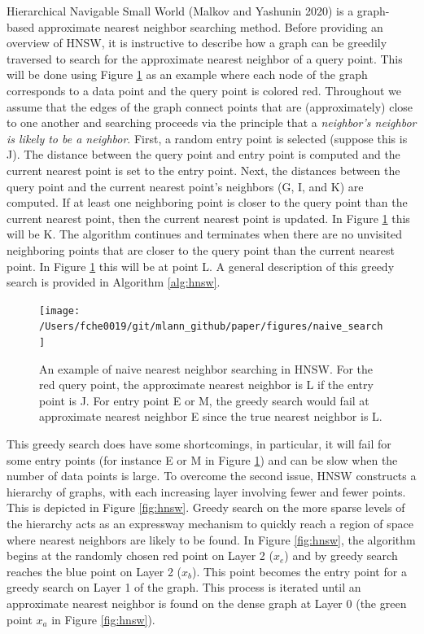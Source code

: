 \documentclass[12pt]{article}
\begin{document}
Hierarchical Navigable Small World (Malkov and Yashunin 2020) is a graph-based approximate nearest neighbor searching method. Before providing an overview of HNSW, it is instructive to describe how a graph can be greedily traversed to search for the approximate nearest neighbor of a query point. This will be done using Figure \ref{fig:naive} as an example where each node of the graph corresponds to a data point and the query point is colored red. Throughout we assume that the edges of the graph connect points that are (approximately) close to one another and searching proceeds via the principle that a \emph{neighbor's neighbor is likely to be a neighbor}. First, a random entry point is selected (suppose this is J). The distance between the query point and entry point is computed and the current nearest point is set to the entry point. Next, the distances between the query point and the current nearest point's neighbors (G, I, and K) are computed. If at least one neighboring point is closer to the query point than the current nearest point, then the current nearest point is updated. In Figure \ref{fig:naive} this will be K. The algorithm continues and terminates when there are no unvisited neighboring points that are closer to the query point than the current nearest point. In Figure \ref{fig:naive} this will be at point L. A general description of this greedy search is provided in Algorithm \ref{alg:hnsw}.

\begin{figure}

{\centering \texttt{[image: /Users/fche0019/git/mlann\_github/paper/figures/naive\_search]} 

}

\caption{An example of naive nearest neighbor searching in HNSW. For the red query point, the approximate nearest neighbor is L if the entry point is J. For entry point E or M, the greedy search would fail at approximate nearest neighbor E since the true nearest neighbor is L. }\label{fig:naive}
\end{figure}

This greedy search does have some shortcomings, in particular, it will fail for some entry points (for instance E or M in Figure \ref{fig:naive}) and can be slow when the number of data points is large. To overcome the second issue, HNSW constructs a hierarchy of graphs, with each increasing layer involving fewer and fewer points. This is depicted in Figure \ref{fig:hnsw}. Greedy search on the more sparse levels of the hierarchy acts as an expressway mechanism to quickly reach a region of space where nearest neighbors are likely to be found. In Figure \ref{fig:hnsw}, the algorithm begins at the randomly chosen red point on Layer 2 (\(x_e\)) and by greedy search reaches the blue point on Layer 2 (\(x_b\)). This point becomes the entry point for a greedy search on Layer 1 of the graph. This process is iterated until an approximate nearest neighbor is found on the dense graph at Layer 0 (the green point \(x_a\) in Figure \ref{fig:hnsw}).
\end{document}
